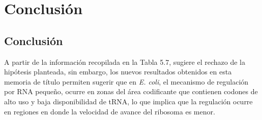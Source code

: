\chapter{Conclusi\'{o}n}

\section{Conclusi\'on}

A partir de la informaci\'on recopilada en la Tabla 5.7, sugiere el rechazo de la hip\'otesis planteada, sin embargo, los nuevos resultados obtenidos en esta memoria de t\'itulo permiten sugerir que en \textit{E. coli}, el mecanismo de regulaci\'on por RNA peque\~no, ocurre en zonas del \'area codificante que contienen codones de alto uso y baja disponibilidad de tRNA, lo que implica que la regulaci\'on ocurre en regiones en donde la velocidad de avance del ribosoma es menor.